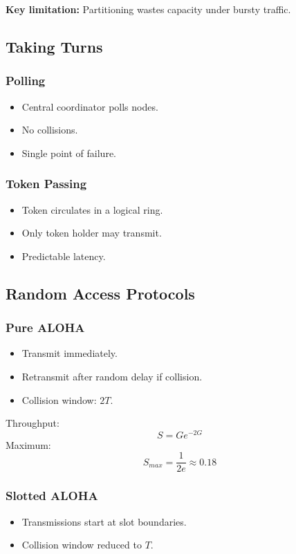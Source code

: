 \documentclass[11pt]{article}
\begin{document}
\textbf{Key limitation:} Partitioning wastes capacity under bursty traffic.

\subsection{Taking Turns}

\subsubsection*{Polling}
\begin{itemize}
    \item Central coordinator polls nodes.
    \item No collisions.
    \item Single point of failure.
\end{itemize}

\subsubsection*{Token Passing}
\begin{itemize}
    \item Token circulates in a logical ring.
    \item Only token holder may transmit.
    \item Predictable latency.
\end{itemize}

\subsection{Random Access Protocols}

\subsubsection*{Pure ALOHA}
\begin{itemize}
    \item Transmit immediately.
    \item Retransmit after random delay if collision.
    \item Collision window: $2T$.
\end{itemize}

Throughput:
\[
S = G e^{-2G}
\]
Maximum:
\[
S_{max} = \frac{1}{2e} \approx 0.18
\]

\subsubsection*{Slotted ALOHA}
\begin{itemize}
    \item Transmissions start at slot boundaries.
    \item Collision window reduced to $T$.
\end{itemize}
\end{document}
